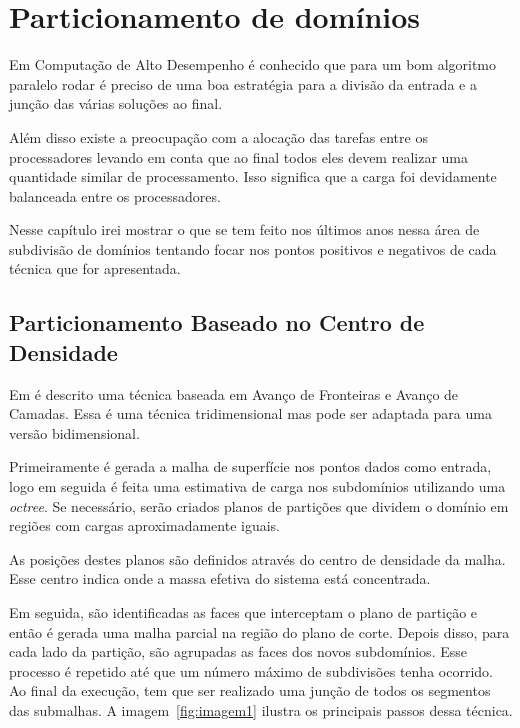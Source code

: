 \pagestyle{empty}
\cleardoublepage
\pagestyle{fancy}
\chapter{Particionamento de domínios}\label{cap2}

Em Computação de Alto Desempenho é conhecido que para um bom algoritmo paralelo rodar é preciso de uma boa estratégia para a divisão da entrada e a junção das várias soluções ao final. 

Além disso existe a preocupação com a alocação das tarefas entre os processadores levando em conta que ao final todos eles devem realizar uma quantidade similar de processamento. Isso significa que a carga foi devidamente balanceada entre os processadores.

Nesse capítulo irei mostrar o que se tem feito nos últimos anos nessa área de subdivisão de domínios tentando focar nos pontos positivos e negativos de cada técnica que for apresentada.


\section{Particionamento Baseado no Centro de Densidade}

Em \cite{bib:Pirzadeh09} é descrito uma técnica baseada em Avanço de Fronteiras e Avanço de Camadas. Essa é uma técnica tridimensional mas pode ser adaptada para uma versão bidimensional.

Primeiramente é gerada a malha de superfície nos pontos dados como entrada, logo em seguida é feita uma estimativa de carga nos subdomínios utilizando uma \textit{octree}. Se necessário, serão criados planos de partições que dividem o domínio em regiões com cargas aproximadamente iguais. 

As posições destes planos são definidos através do centro de densidade da malha. Esse centro indica onde a massa efetiva do sistema está concentrada.

Em seguida, são identificadas as faces que interceptam o plano de partição e então é gerada uma malha parcial na região do plano de corte. Depois disso, para cada lado da partição, são agrupadas as faces dos novos subdomínios. Esse processo é repetido até que um número máximo de subdivisões tenha ocorrido. Ao final da execução, tem que ser realizado uma junção de todos os segmentos das submalhas. A imagem~\ref{fig:imagem1} ilustra os principais passos dessa técnica.

